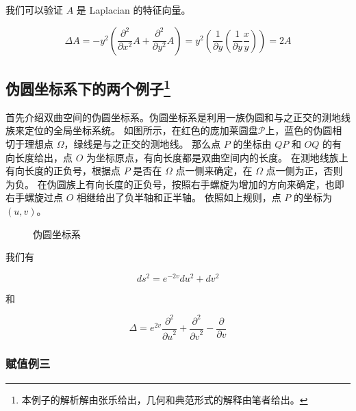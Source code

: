 \documentclass[a4paper,12pt]{article}
\numberwithin{definition}{section}
\numberwithin{lemma}{section}
\numberwithin{proposition}{section}
\numberwithin{theorem}{section}
\numberwithin{grammar}{section}
\numberwithin{program}{section}
\numberwithin{convention}{section}
\numberwithin{corollary}{section}
\begin{document}
我们可以验证 $A$ 是 Laplacian 的特征向量。

$$
\Delta A = - y^2 (\frac{\partial^2}{\partial x^2} A + \frac{\partial^2}{\partial y^2} A) = y^2 (\frac{1}{\partial y} (\frac{1}{\partial y} \frac{x}{y})) = 2 A
$$

\subsection{伪圆坐标系下的两个例子\footnote{本例子的解析解由张乐给出，几何和典范形式的解释由笔者给出。}}

首先介绍双曲空间的伪圆坐标系。伪圆坐标系是利用一族伪圆和与之正交的测地线族来定位的全局坐标系统。
如图所示，在红色的庞加莱圆盘$\mathcal{P}$上，蓝色的伪圆相切于理想点 $\Omega$，绿线是与之正交的测地线。
那么点 $P$ 的坐标由 $QP$ 和 $OQ$ 的有向长度给出，点 $O$ 为坐标原点，有向长度都是双曲空间内的长度。
在测地线族上有向长度的正负号，根据点 $P$ 是否在 $\Omega$ 点一侧来确定，在 $\Omega$ 点一侧为正，否则为负。
在伪圆族上有向长度的正负号，按照右手螺旋为增加的方向来确定，也即右手螺旋过点 $O$ 相继给出了负半轴和正半轴。
依照如上规则，点 $P$ 的坐标为 $(u,v)$。

\begin{figure}[ht]
\centering
{}
\caption{伪圆坐标系}\label{fig:horocyclecoord}
\end{figure}

我们有

$$
ds^2 = e^{-2v} du^2 + dv^2
$$

和

$$
\Delta = e^{2v} \frac{\partial^2}{{\partial u}^2} + \frac{\partial^2}{{\partial v}^2} - \frac{\partial}{\partial v}
$$

\subsubsection{赋值例三}\label{subsec:exmp3}
\end{document}
